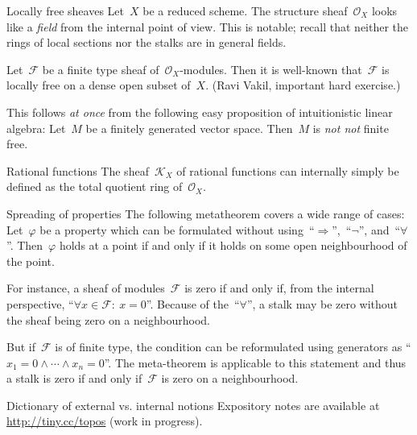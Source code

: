 \documentclass[table]{beamer}
\newcommand{\F}{\mathcal{F}}
\renewcommand{\O}{\mathcal{O}}
\newcommand{\K}{\mathcal{K}}
\begin{document}
\begin{frame}[t]
\begin{columns}[t]
\begin{column}{0.3\textwidth}
  \begin{block}{Locally free sheaves}
    Let~$X$ be a reduced scheme. The structure sheaf~$\O_X$ looks like a \emph{field} from the
    internal point of view. This is notable; recall that neither the rings of
    local sections nor the stalks are in general fields.\medskip

    Let~$\F$ be a finite type sheaf of~$\O_X$-modules. 
    Then it is well-known that~$\F$ is locally free on a dense open subset
    of~$X$. (Ravi Vakil, important hard exercise.) \medskip

    This follows \emph{at once} from the following easy proposition of intuitionistic
    linear algebra: Let~$M$ be a finitely generated vector space. Then~$M$ is
    \emph{not not} finite free.
  \end{block}
  \bigskip

  \begin{block}{Rational functions}
    The sheaf~$\K_X$ of rational functions can internally simply be defined as
    the total quotient ring of~$\O_X$.
  \end{block}
  \bigskip

  \begin{block}{Spreading of properties}
    The following metatheorem covers a wide range of cases:
    Let~$\varphi$ be a property which can be formulated without
    using~``$\Rightarrow$'',~``$\neg$'', and~``$\forall$''. Then~$\varphi$
    holds at a point if and only if it holds on some open neighbourhood of the
    point.\medskip

    For instance, a sheaf of modules~$\F$ is zero if and only if, from the
    internal perspective, ``$\forall x \in \F{:}\ x = 0$''. Because of
    the~``$\forall$'', a stalk may be zero without the sheaf being zero on a
    neighbourhood.\medskip

    But if~$\F$ is of finite type, the condition can be reformulated using
    generators as ``$x_1 = 0 \wedge \cdots \wedge x_n = 0$''. The meta-theorem
    is applicable to this statement and thus a stalk is zero if and only if~$\F$
    is zero on a neighbourhood.
  \end{block}

  \vspace{1cm}
  \begin{alertblock}{Dictionary of external vs. internal notions}
    Expository notes are available at \url{http://tiny.cc/topos} (work in
    progress).
  \end{alertblock}
\end{column}

\end{columns}\end{frame}
\end{document}
